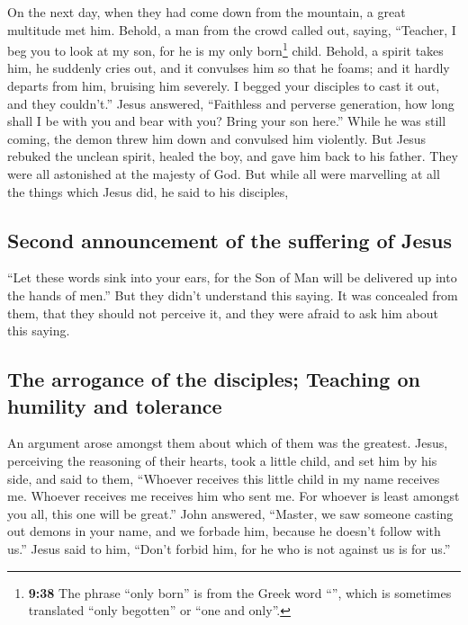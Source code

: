  On the next day, when they had come down from the
mountain, a great multitude met him.  Behold, a man from
the crowd called out, saying, ``Teacher, I beg you to look at my son,
for he is my only born\footnote{\textbf{9:38} The phrase ``only born''
  is from the Greek word ``'', which is sometimes
  translated ``only begotten'' or ``one and only''.} child.
 Behold, a spirit takes him, he suddenly cries out, and
it convulses him so that he foams; and it hardly departs from him,
bruising him severely.  I begged your disciples to cast
it out, and they couldn't.''  Jesus answered, ``Faithless
and perverse generation, how long shall I be with you and bear with you?
Bring your son here.''  While he was still coming, the
demon threw him down and convulsed him violently. But Jesus rebuked the
unclean spirit, healed the boy, and gave him back to his father.
 They were all astonished at the majesty of God. But
while all were marvelling at all the things which Jesus did, he said to
his disciples,

\hypertarget{second-announcement-of-the-suffering-of-jesus}{%
\subsection{Second announcement of the suffering of
Jesus}\label{second-announcement-of-the-suffering-of-jesus}}

 ``Let these words sink into your ears, for the Son of
Man will be delivered up into the hands of men.''  But
they didn't understand this saying. It was concealed from them, that
they should not perceive it, and they were afraid to ask him about this
saying.

\hypertarget{the-arrogance-of-the-disciples-teaching-on-humility-and-tolerance}{%
\subsection{The arrogance of the disciples; Teaching on humility and
tolerance}\label{the-arrogance-of-the-disciples-teaching-on-humility-and-tolerance}}

 An argument arose amongst them about which of them was
the greatest.  Jesus, perceiving the reasoning of their
hearts, took a little child, and set him by his side, 
and said to them, ``Whoever receives this little child in my name
receives me. Whoever receives me receives him who sent me. For whoever
is least amongst you all, this one will be great.''  John
answered, ``Master, we saw someone casting out demons in your name, and
we forbade him, because he doesn't follow with us.'' 
Jesus said to him, ``Don't forbid him, for he who is not against us is
for us.''

